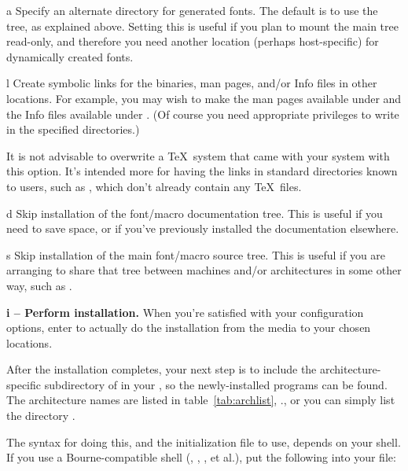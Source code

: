 \documentclass{article}
\begin{document}
\begin{ttdescription}
\item [a] Specify an alternate directory for generated fonts.
The default is to use the  tree, as explained above.
Setting this is useful if you plan to mount the main tree read-only, and
therefore you need another location (perhaps host-specific) for
dynamically created fonts.

\item [l] Create symbolic links for the binaries, man pages,
and\slash or  Info files in other locations.  For example, you may
wish to make the man pages available under  and
the Info files available under .  (Of course
you need appropriate privileges to write in the specified directories.)

It is not advisable to overwrite a \TeX\ system that came with your
system with this option.  It's intended more for having the links in
standard directories known to users, such as ,
which don't already contain any \TeX\ files.

\item [d] Skip installation of the font/macro documentation tree.
This is useful if you need to save space, or if you've previously
installed the documentation elsewhere.

\item [s] Skip installation of the main font/macro source
tree.  This is useful if you are arranging to share that tree between
machines and\slash or architectures in some other way, such as .

\end{ttdescription}

\textbf{i -- Perform installation.}  When you're satisfied with your
configuration options, enter  to actually do the installation
from the media to your chosen locations.

After the installation completes, your next step is to include the
architecture-specific subdirectory of  in your
, so the newly-installed programs can be found.  The
architecture names are listed in table~\ref{tab:archlist},
\p.\pageref{tab:archlist}, or you can simply list the directory
.

The syntax for doing this, and the initialization file to use, depends
on your shell.  If you use a Bourne-compatible shell (,
, , et al.), put the following into your
 file:
\end{document}
